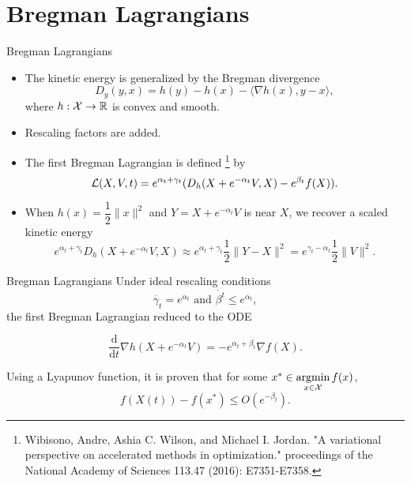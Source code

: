 \section{Bregman Lagrangians}
\begin{frame}{Bregman Lagrangians}
  \begin{itemize}
    \item The kinetic energy is generalized by the Bregman divergence
          \begin{equation}
            D_y(y,x) = h(y) - h(x) - \langle \nabla h(x), y-x\rangle,
          \end{equation}
          where $h:\mathcal{X}\to\mathbb{R}$ is convex and smooth.
    \item Rescaling factors are added.
    \item The first Bregman Lagrangian is defined \footnote{Wibisono, Andre, Ashia C. Wilson, and Michael I. Jordan. "A variational perspective on accelerated methods in optimization." proceedings of the National Academy of Sciences 113.47 (2016): E7351-E7358.} by
          \begin{equation}
            \mathcal{L}(X,V,t) = e^{\alpha_t+\gamma_t}(D_h(X+e^{-\alpha_t}V, X)- e^{\beta_t}f(X)).
          \end{equation}

    \item When $h(x) = \dfrac{1}{2}\|x\|^2$ and $Y = X+e^{-\alpha_t}V$ is near $X$, we recover a scaled kinetic energy
          $$e^{\alpha_t+\gamma_t}D_h(X+e^{-\alpha_t}V, X)\approx e^{\alpha_t+\gamma_t}\dfrac{1}{2}\|Y-X\|^2 = e^{\gamma_t-\alpha_t}\dfrac{1}{2}\|V\|^2.$$
  \end{itemize}
\end{frame}

\begin{frame}{Bregman Lagrangians}
  Under ideal rescaling conditions
  \begin{equation}
    \label{eq:rescaling}
    \dot{\gamma_t} = e^{\alpha_t} \text{ and } \dot{\beta^t} \le e^{\alpha_t},
  \end{equation}
  the first Bregman Lagrangian reduced to the ODE

  \begin{equation}
    \label{eq:1st-bregman-ode}
    \dfrac{\mathrm{d}}{\mathrm{d}t}\nabla h(X + e^{-\alpha_t}V) = -e^{\alpha_t+\beta_t}\nabla f(X).
  \end{equation}

  Using a Lyapunov function, it is proven that for some $x^*\in\operatorname*{argmin}\limits_{x\in\mathcal{X}}f(x)$,
  \begin{equation}
    f(X(t)) - f(x^*) \le O(e^{-\beta_t}).
  \end{equation}
\end{frame}

